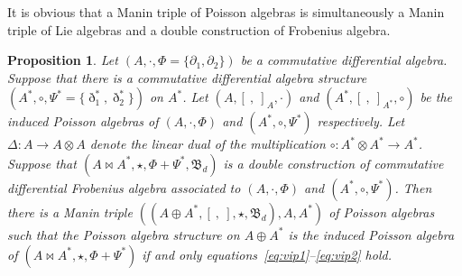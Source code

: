 \documentclass[10pt,a4paper]{amsart}
\numberwithin{equation}{section}
\newtheorem{Proposition}[Theorem]{Proposition}
{ \theoremstyle{definition}
	\newtheorem{Definition}[Theorem]{Definition}
	\newtheorem{Note}[Theorem]{Note}
	\newtheorem{Example}[Theorem]{Example}
	\newtheorem{Remark}[Theorem]{Remark} }
\begin{document}
\begin{Remark}It is obvious that a Manin triple of Poisson algebras is simultaneously a Manin triple of Lie algebras \cite{chari1995guide} and a double construction of Frobenius algebra.
\end{Remark}

\begin{Proposition}\label{pro:assFro}
 Let $(A, \cdot, \Phi = \{\partial_1, \partial_2\})$ be a commutative differential algebra.
 Suppose that there is a commutative differential algebra structure $(A^*, \circ, \Psi^*= \{\eth_1^*,\eth_2^*\})$ on $A^*$.
 Let $(A, [\ ,\ ]_A, \cdot)$ and $(A^*, [\ ,\ ]_{A^*}, \circ)$ be the induced Poisson algebras of $(A, \cdot, \Phi)$ and $(A^*, \circ, \Psi^*)$ respectively.
 Let $\Delta\colon A \to A \otimes A$ denote the linear dual of the multiplication $\circ\colon A^* \otimes A^* \to A^*$.
 Suppose that $(A \bowtie A^*, \star, \Phi + \Psi^*, \mathfrak{B}_d)$ is a double construction of commutative differential Frobenius algebra associated to $(A, \cdot, \Phi)$ and $(A^*, \circ, \Psi^*)$.
 Then there is a Manin triple $((A \oplus A^*,[\ ,\ ], \star, \mathfrak{B}_d), A, A^*)$ of Poisson algebras
 such that the Poisson algebra structure on $A \oplus A^*$ is the induced Poisson algebra of $(A \bowtie A^*, \star, \Phi + \Psi^*)$
 if and only equations~\eqref{eq:vip1}--\eqref{eq:vip2} hold.
 \end{Proposition}
\end{document}
